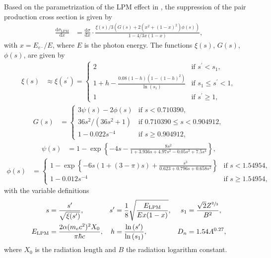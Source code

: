 Based on the parametrization of the LPM effect in \cite{RevModPhys.71.1501}, the suppression of the pair production cross section is given by
%
\begin{align}
	\label{eqn:lpm_photopair}
	\frac{\mathrm{d}\sigma_\text{LPM}}{\mathrm{d}x} &= \frac{\mathrm{d}\sigma}{\mathrm{d}x} \cdot \frac{\xi(s) / 3 \left(G(s) + 2 \left( x^2 + (1 - x)^2 \right) \phi(s) \right)}{1 - 4 / 3 x (1 - x)},
\end{align}
%
with $x = E_{e^{-}} / E$, where $E$ is the photon energy.
The functions $\xi(s)$, $G(s)$, $\phi(s)$, are given by \cite{PhysRevD.25.1291, PhysRev.103.1811}
%
\begin{align}
	\xi(s) &\approx \xi(s^\prime) =
	\begin{cases}
		2 & \text{if $s^\prime < s_1$}, \\
		1 + h - \frac{0.08 (1 - h) (1 - (1-h)^2)}{\ln{(s_1)}} & \text{if $s_1 \leq s^\prime < 1$}, \\
		1 & \text{if $s^\prime \geq 1$},
	\end{cases}
\end{align}
%
\begin{align}
	G(s) &=
	\begin{cases}
		3\psi(s) - 2\phi(s) & \text{if $s < \num{0.710390}$}, \\
		36s^2 / \left(36s^2 + 1 \right) & \text{if $\num{0.710390} \leq s < \num{0.904912}$}, \\
		1 - 0.022s^{-4} & \text{if $s \geq \num{0.904912}$},
	\end{cases}
\end{align}
%
\begin{align}
	\psi(s) &= 1 - \exp{\left\{ -4s - \frac{8s^2}{1 + 3.936s + 4.97s^2 - 0.05s^3 + 7.5 s^4} \right\}},
\end{align}
%
\begin{align}
	\phi(s) &=
	\begin{cases}
		1 - \exp{\left\{ -6s \left(1 + (3 - \pi) s\right) + \frac{s^3}{ 0.623 + 0.796s + 0.658 s^2} \right\}} & \text{if $s < \num{1.54954}$}, \\
		1 - 0.012 s^{-4} & \text{if $s \geq \num{1.54954}$},
	\end{cases}
\end{align}
%
with the variable definitions
%
\begin{align}
	s &= \frac{s^\prime}{\sqrt{\xi(s^\prime)}}, & s^\prime &= \frac{1}{8} \sqrt{\frac{E_\text{LPM}}{E x ( 1 - x)}}, & s_1 &= \frac{\sqrt{2} Z^{\sfrac{2}{3}}}{B^2}, \\ E_\text{LPM} &= \frac{2 \alpha (m_e c^2)^2 X_0}{\pi \hbar c}, & h &= \frac{\ln{(s^\prime)}}{\ln{(s_1)}}, & D_n &= 1.54 A^{0.27},
\end{align}
%
where $X_0$ is the radiation length and $B$ the radiation logarithm constant.

